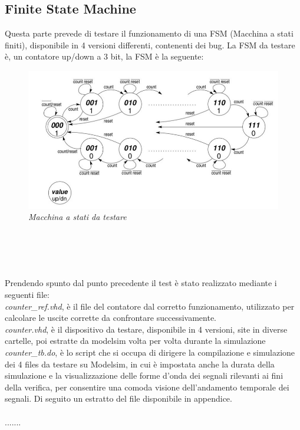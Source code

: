 \subsection{Finite State Machine}
Questa parte prevede di testare il  funzionamento di una FSM (Macchina a stati finiti), disponibile in 4 versioni differenti, contenenti dei bug.  
La FSM da testare è, un contatore up/down a 3 bit, la FSM è la seguente:
\begin{figure}[!htb]
	\centering
	\includegraphics[scale=0.8]{immagini/fsm_lab6}
	\caption{\textit{Macchina a stati da testare}}
	\label{Fsm, up-down counter}
\end{figure}
\\
\\
\\
\\
Prendendo spunto dal punto precedente il test è stato realizzato mediante i seguenti file:\\
\textit{counter\_ref.vhd}, è il file del contatore dal corretto funzionamento, utilizzato per calcolare le uscite corrette da confrontare successivamente.
\\
\textit{counter.vhd}, è il dispositivo da testare, disponibile in 4 versioni, site in diverse cartelle, poi estratte da modelsim volta per volta durante la simulazione
\\
\textit{counter\_tb.do}, è lo script che si occupa di dirigere la compilazione e simulazione dei 4 files da testare su Modelsim, in cui è impostata anche la durata della simulazione e la visualizzazione delle forme d’onda dei segnali rilevanti ai fini della verifica, per consentire una comoda visione dell’andamento temporale dei segnali.
Di seguito un estratto del file disponibile in appendice.\\
\\
.......\\
